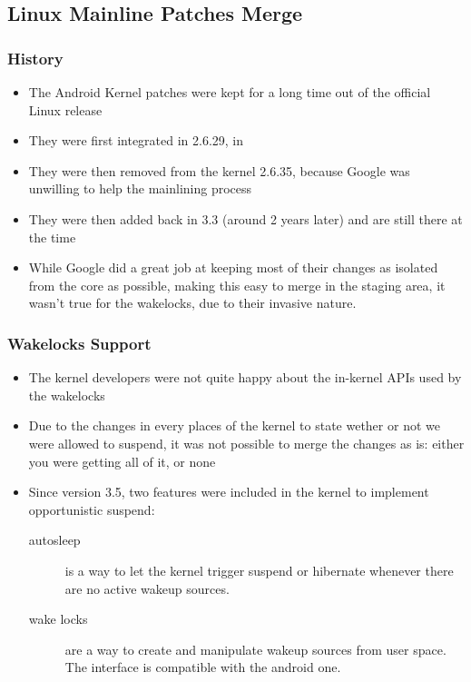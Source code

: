 \subsection{Linux Mainline Patches Merge}
\begin{frame}
  \frametitle{History}
  \begin{itemize}
  \item The Android Kernel patches were kept for a long time out of
    the official Linux release
  \item They were first integrated in 2.6.29, in
  \item They were then removed from the kernel 2.6.35, because Google
    was unwilling to help the mainlining process
  \item They were then added back in 3.3 (around 2 years later) and
    are still there at the time
  \item While Google did a great job at keeping most of their changes
    as isolated from the core as possible, making this easy to merge
    in the staging area, it wasn't true for the wakelocks, due to
    their invasive nature.
  \end{itemize}
\end{frame}

\begin{frame}
  \frametitle{Wakelocks Support}
  \begin{itemize}
  \item The kernel developers were not quite happy about the
    in-kernel APIs used by the wakelocks
  \item Due to the changes in every places of the kernel to state
    wether or not we were allowed to suspend, it was not possible to
    merge the changes as is: either you were getting all of it, or
    none
  \item Since version 3.5, two features were included in the kernel to
    implement opportunistic suspend:
    \begin{description}
    \item[autosleep] is a way to let the kernel trigger suspend or
      hibernate whenever there are no active wakeup sources.
    \item[wake locks] are a way to create and manipulate wakeup
      sources from user space. The interface is compatible with the
      android one.
    \end{description}
  \end{itemize}
\end{frame}

